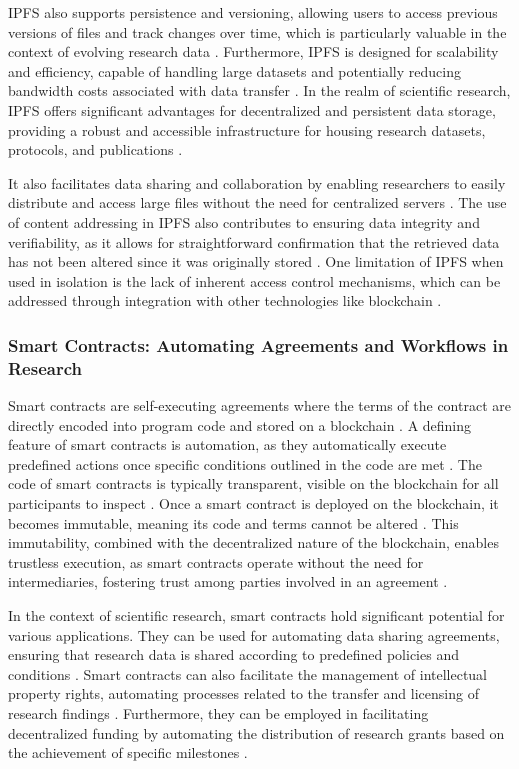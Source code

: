 \documentclass{article}
\begin{document}
IPFS also supports persistence and versioning, allowing users to access previous versions of files and track changes over time, which is particularly valuable in the context of evolving research data \cite{fu2019towards}. Furthermore, IPFS is designed for scalability and efficiency, capable of handling large datasets and potentially reducing bandwidth costs associated with data transfer \cite{dabek2001wide}. In the realm of scientific research, IPFS offers significant advantages for decentralized and persistent data storage, providing a robust and accessible infrastructure for housing research datasets, protocols, and publications \cite{benet2014ipfs}.

It also facilitates data sharing and collaboration by enabling researchers to easily distribute and access large files without the need for centralized servers \cite{benet2014ipfs}. The use of content addressing in IPFS also contributes to ensuring data integrity and verifiability, as it allows for straightforward confirmation that the retrieved data has not been altered since it was originally stored \cite{benet2014ipfs}. One limitation of IPFS when used in isolation is the lack of inherent access control mechanisms, which can be addressed through integration with other technologies like blockchain \cite{xu2019secure}.

\subsubsection{Smart Contracts: Automating Agreements and Workflows in Research}

Smart contracts are self-executing agreements where the terms of the contract are directly encoded into program code and stored on a blockchain \cite{szabo1997formalizing}. A defining feature of smart contracts is automation, as they automatically execute predefined actions once specific conditions outlined in the code are met \cite{szabo1997formalizing}. The code of smart contracts is typically transparent, visible on the blockchain for all participants to inspect \cite{szabo1997formalizing}. Once a smart contract is deployed on the blockchain, it becomes immutable, meaning its code and terms cannot be altered \cite{szabo1997formalizing}. This immutability, combined with the decentralized nature of the blockchain, enables trustless execution, as smart contracts operate without the need for intermediaries, fostering trust among parties involved in an agreement \cite{szabo1997formalizing}.

In the context of scientific research, smart contracts hold significant potential for various applications. They can be used for automating data sharing agreements, ensuring that research data is shared according to predefined policies and conditions \cite{bartling2014opening}. Smart contracts can also facilitate the management of intellectual property rights, automating processes related to the transfer and licensing of research findings \cite{vandrouschka2020decentralized}. Furthermore, they can be employed in facilitating decentralized funding by automating the distribution of research grants based on the achievement of specific milestones \cite{vandrouschka2020decentralized}.
\end{document}
